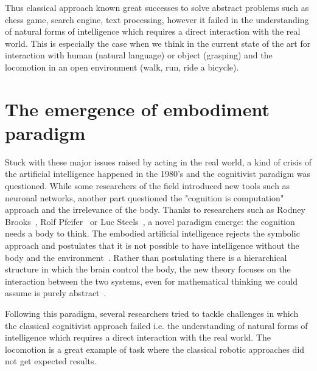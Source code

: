 Thus classical approach known great successes to solve abstract problems such as chess game, search engine, text processing, however it failed in the understanding of natural forms of intelligence which requires a direct interaction with the real world. This is especially the case when we think in the current state of the art for interaction with human (natural language) or object (grasping) and the locomotion in an open environment (walk, run, ride a bicycle).


\section{The emergence of embodiment paradigm} %

Stuck with these major issues raised by acting in the real world, a kind of crisis of the artificial intelligence happened in the 1980's and the cognitivist paradigm was questioned. While some researchers of the field introduced new tools such as neuronal networks, another part questioned the "cognition is computation" approach and the irrelevance of the body.
Thanks to researchers such as Rodney Brooks~\cite{brooks1986achieving}, Rolf Pfeifer~\cite{pfeifer2001understanding} or Luc Steels~\cite{steels1995artificial}, a novel paradigm emerge: the cognition needs a body to think. The embodied artificial intelligence rejects the symbolic approach and postulates that it is not possible to have intelligence without the body and the environment~\cite{pfeifer2001understanding}. Rather than postulating there is a hierarchical structure in which the brain control the body, the new theory focuses on the interaction between the two systems, even for mathematical thinking we could assume is purely abstract~\cite{lakoff2000mathematics}.

Following this paradigm, several researchers tried to tackle challenges in which the classical cognitivist approach failed i.e. the understanding of natural forms of intelligence which requires a direct interaction with the real world. The locomotion is a great example of task where the classical robotic approaches did not get expected results.

